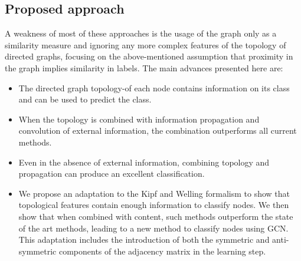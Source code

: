 \subsection*{Proposed approach}
A weakness of most of these approaches is the usage of the graph only as a similarity measure and ignoring any more complex features of the topology of directed graphs, focusing on the above-mentioned assumption that proximity in the graph implies similarity in labels. 
The main advances presented here are:
\begin{itemize}
\item   The directed graph topology-of each node contains information on its class and can be used to predict the class.
\item   When the topology is combined with information propagation and convolution of external information, the combination outperforms all current methods.
\item   Even in the absence of external information, combining topology and propagation can produce an excellent classification. 
\item   We propose an adaptation to the Kipf and Welling formalism to show that topological features contain enough information to classify nodes. We then show that when combined with content, such methods outperform the state of the art methods, leading to a new method to classify nodes using GCN. This adaptation includes the introduction of both the symmetric and anti-symmetric components of the adjacency matrix in the learning step.
\end{itemize}


